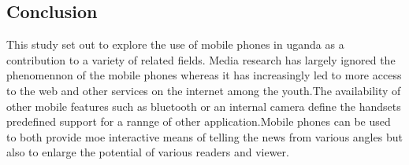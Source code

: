 \documentclass[12]{article}
\begin{document}
\subsection{Conclusion}
This study set out to explore the use of mobile phones in uganda as a contribution to a variety of related fields. Media research has largely ignored the phenomennon of the mobile phones whereas it has increasingly led to more access to the web and other services on the internet among the youth.The availability of other mobile features such as bluetooth or an internal camera define the handsets predefined support for a rannge of other application.Mobile phones can be used to both provide moe interactive means of telling the news from various angles but also to enlarge the potential of various readers and viewer.
\end{document}
